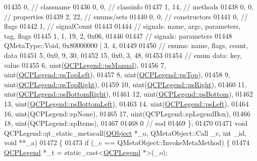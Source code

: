 \begin{DoxyCode}
01435        0,       \textcolor{comment}{// classname}
01436        0,    0, \textcolor{comment}{// classinfo}
01437        1,   14, \textcolor{comment}{// methods}
01438        0,    0, \textcolor{comment}{// properties}
01439        2,   22, \textcolor{comment}{// enums/sets}
01440        0,    0, \textcolor{comment}{// constructors}
01441        0,       \textcolor{comment}{// flags}
01442        1,       \textcolor{comment}{// signalCount}
01443 
01444  \textcolor{comment}{// signals: name, argc, parameters, tag, flags}
01445        1,    1,   19,    2, 0x06,
01446 
01447  \textcolor{comment}{// signals: parameters}
01448     QMetaType::Void, 0x80000000 | 3,    4,
01449 
01450  \textcolor{comment}{// enums: name, flags, count, data}
01451        5, 0x0,    9,   30,
01452       15, 0x0,    3,   48,
01453 
01454  \textcolor{comment}{// enum data: key, value}
01455        6, uint(\hyperlink{a00045_aa61c3d82a6c7942dddefbf1ed1f7049fadfd57c395cae91cd95231c926c0a38ca}{QCPLegend::psManual}),
01456        7, uint(\hyperlink{a00045_aa61c3d82a6c7942dddefbf1ed1f7049fa1f5bb82f19be99ee3722a540b76c3c85}{QCPLegend::psTopLeft}),
01457        8, uint(\hyperlink{a00045_aa61c3d82a6c7942dddefbf1ed1f7049fa7ca820289c7938092f497fbd4d706f5d}{QCPLegend::psTop}),
01458        9, uint(\hyperlink{a00045_aa61c3d82a6c7942dddefbf1ed1f7049fadc969b13706ba4fd802bbc27e0abb18a}{QCPLegend::psTopRight}),
01459       10, uint(\hyperlink{a00045_aa61c3d82a6c7942dddefbf1ed1f7049fa71969c414ec15afabe2761131ad85766}{QCPLegend::psRight}),
01460       11, uint(\hyperlink{a00045_aa61c3d82a6c7942dddefbf1ed1f7049faf4120842dbc223cf8523188f15146d31}{QCPLegend::psBottomRight}),
01461       12, uint(\hyperlink{a00045_aa61c3d82a6c7942dddefbf1ed1f7049fac32970f4bf28ef780f15365abcc9fbd3}{QCPLegend::psBottom}),
01462       13, uint(\hyperlink{a00045_aa61c3d82a6c7942dddefbf1ed1f7049fa36e2c1900a0d39596ee26074c7815ee9}{QCPLegend::psBottomLeft}),
01463       14, uint(\hyperlink{a00045_aa61c3d82a6c7942dddefbf1ed1f7049fac9c7c1c0f8d1894792fbb71854002ebe}{QCPLegend::psLeft}),
01464       16, uint(QCPLegend::spNone),
01465       17, uint(QCPLegend::spLegendBox),
01466       18, uint(QCPLegend::spItems),
01467 
01468        0        \textcolor{comment}{// eod}
01469 \};
01470 
01471 \textcolor{keywordtype}{void} QCPLegend::qt\_static\_metacall(\hyperlink{a00059}{QObject} *\_o, QMetaObject::Call \_c, \textcolor{keywordtype}{int} \_id, \textcolor{keywordtype}{void} **\_a)
01472 \{
01473     \textcolor{keywordflow}{if} (\_c == QMetaObject::InvokeMetaMethod) \{
01474         \hyperlink{a00045}{QCPLegend} *\_t = \textcolor{keyword}{static\_cast<}\hyperlink{a00045}{QCPLegend} *\textcolor{keyword}{>}(\_o);

\end{DoxyCode}
